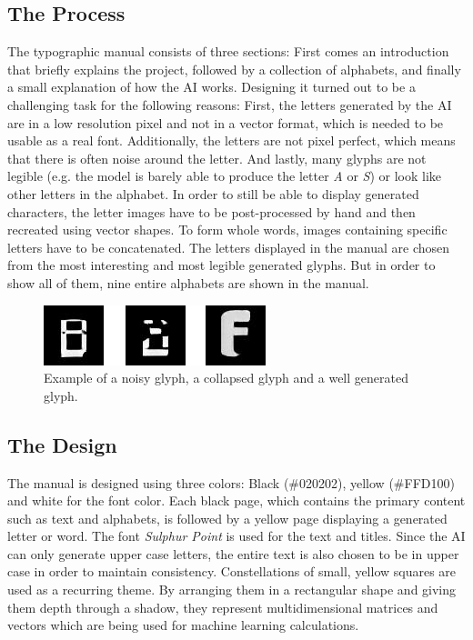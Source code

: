 \documentclass[11pt]{article}
\begin{document}
\subsection{The Process}
The typographic manual consists of three sections: First comes an introduction that briefly explains the project, followed by a collection of alphabets, and finally a small explanation of how the AI works.
Designing it turned out to be a challenging task for the following reasons: First, the letters generated by the AI are in a low resolution pixel and not in a vector format, which is needed to be usable as a real font. Additionally, the letters are not pixel perfect, which means that there is often noise around the letter. And lastly, many glyphs are not legible (e.g. the model is barely able to produce the letter \emph{A} or \emph{S}) or look like other letters in the alphabet.
In order to still be able to display generated characters, the letter images have to be post-processed by hand and then recreated using vector shapes. To form whole words, images containing specific letters have to be concatenated. The letters displayed in the manual are chosen from the most interesting and most legible generated glyphs. But in order to show all of them, nine entire alphabets are shown in the manual.

\begin{figure}
    \centering
    \includegraphics[width=0.5\columnwidth]{examples.png}
    \caption{Example of a noisy glyph, a collapsed glyph and a well generated glyph.}
    \label{fig:examples}
\end{figure}

\subsection{The Design}
The manual is designed using three colors: Black (\textcolor{blackColor}{\#020202}), yellow (\textcolor{yellowColor}{\#FFD100}) and white for the font color. Each black page, which contains the primary content such as text and alphabets, is followed by a yellow page displaying a generated letter or word. The font \emph{Sulphur Point} is used for the text and titles. Since the AI can only generate upper case letters, the entire text is also chosen to be in upper case in order to maintain consistency.
Constellations of small, yellow squares are used as a recurring theme. By arranging them in a rectangular shape and giving them depth through a shadow, they represent multidimensional matrices and vectors which are being used for machine learning calculations.
\end{document}
